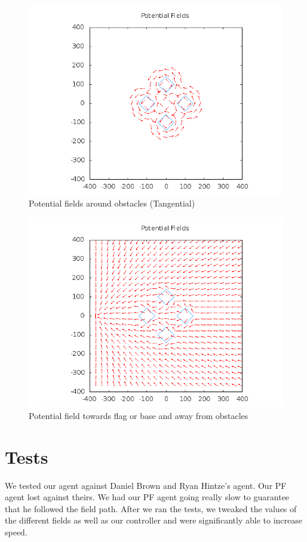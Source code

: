\documentclass[11pt]{article}
\begin{document}
\begin{figure}[h]
	\caption{Potential fields around obstacles (Tangential)}
	\includegraphics[scale=.2]{plots/rotated_box_world/pfObstaclesTangential.png}
\end{figure}
\begin{figure}[h]
	\caption{Potential field towards flag or base and away from obstacles}
	\includegraphics[scale=.2]{plots/rotated_box_world/pfFlagsAndObstacles.png}
\end{figure}

\section{Tests}
We tested our agent against Daniel Brown and Ryan Hintze's agent.
Our PF agent lost against theirs.
We had our PF agent going really slow to guarantee that he followed the field path.
After we ran the tests, we tweaked the values of the different fields as well as our controller and were significantly able to increase speed.
\end{document}
